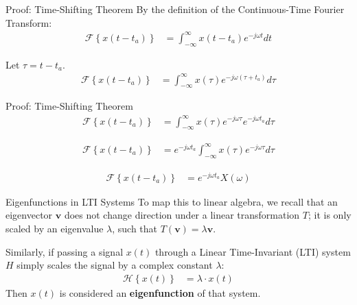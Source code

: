 \documentclass{beamer}
\providecommand{\cbrak}[1]{\ensuremath{\left\{#1\right\}}}
\theoremstyle{remark}
\numberwithin{equation}{section}
\begin{document}
\begin{frame}{Proof: Time-Shifting Theorem}
By the definition of the Continuous-Time Fourier Transform:
\begin{align}
    \mathcal{F}\cbrak{x(t - t_a)} &= \int_{-\infty}^{\infty} x(t - t_a) e^{-j\omega t} dt
\end{align}

Let $\tau = t - t_a$. \\
\begin{align}
    \mathcal{F}\cbrak{x(t - t_a)} &= \int_{-\infty}^{\infty} x(\tau) e^{-j\omega (\tau + t_a)} d\tau
\end{align}
\end{frame}

\begin{frame}{Proof: Time-Shifting Theorem}
\begin{align}
    \mathcal{F}\cbrak{x(t - t_a)} &= \int_{-\infty}^{\infty} x(\tau) e^{-j\omega \tau} e^{-j\omega t_a} d\tau
\end{align}

\begin{align}
    \mathcal{F}\cbrak{x(t - t_a)} &= e^{-j\omega t_a} \int_{-\infty}^{\infty} x(\tau) e^{-j\omega \tau} d\tau
\end{align}

\begin{align}
    \mathcal{F}\cbrak{x(t - t_a)} &= e^{-j\omega t_a} X(\omega)
\end{align}
\end{frame}

\begin{frame}{Eigenfunctions in LTI Systems}
To map this to linear algebra, we recall that an eigenvector $\mathbf{v}$ does not change direction under a linear transformation $T$; it is only scaled by an eigenvalue $\lambda$, such that $T(\mathbf{v}) = \lambda \mathbf{v}$.
\vspace{0.5cm}

Similarly, if passing a signal $x(t)$ through a Linear Time-Invariant (LTI) system $H$ simply scales the signal by a complex constant $\lambda$:
\begin{align}
    \mathcal{H}\cbrak{x(t)} &= \lambda \cdot x(t)
\end{align}
Then $x(t)$ is considered an \textbf{eigenfunction} of that system.
\end{frame}
\end{document}
